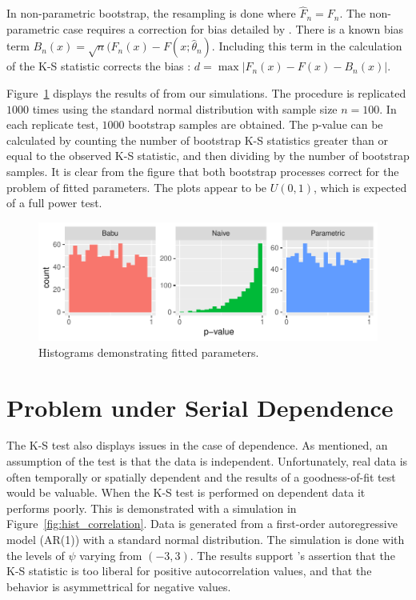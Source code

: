 \documentclass[12pt, letterpaper, titlepage]{article}
\begin{document}
In non-parametric bootstrap, the resampling is done where $\hat{F}_n = F_n$. The non-parametric
case requires a correction for bias detailed by \citet{Babu}. There is a known bias
term $B_{n}(x) = \sqrt{n}(F_{n}(x) - F(x;\hat{\theta}_n)$. Including this term in the
calculation of the K-S statistic corrects the bias \citet{Babu}:
$d = \max\lvert F_{n}(x) - F(x) - B_{n}(x) \rvert$.

Figure~\ref{fig:hist_fitted} displays the results of from our simulations. The procedure 
is replicated $1000$ times using the standard normal distribution with sample size $n=100$. 
In each replicate test, $1000$ bootstrap samples are obtained. The p-value can be calculated
by counting the number of bootstrap K-S statistics greater than or equal to the observed K-S statistic, 
and then dividing by the number of bootstrap samples. It is clear from the figure that both
bootstrap processes correct for the problem of fitted parameters. The plots appear to be
$U(0,1)$, which is expected of a full power test.

\begin{figure}[tbp]
  \centering
  \includegraphics{hist_fitted}
  \caption{Histograms demonstrating fitted parameters.}
  \label{fig:hist_fitted}
\end{figure}

\hypertarget{sec:dependence}{%
\section{Problem under Serial Dependence}\label{sec:dependence}}

The K-S test also displays issues in the case of dependence. As mentioned, an assumption of the 
test is that the data is independent. Unfortunately, real data is often temporally
or spatially dependent and the results of a goodness-of-fit test would be valuable. 
When the K-S test is performed on dependent data it performs poorly. This is demonstrated
with a simulation in Figure~\ref{fig:hist_correlation}. Data is generated from a
first-order autoregressive model (AR(1)) with a standard normal distribution. The simulation
is done with the levels of $\psi$ varying from $(-3,3)$. The results support \citet{Durilleul}'s 
assertion that the K-S statistic is too liberal for positive autocorrelation values, and 
that the behavior is asymmettrical for negative values.
\end{document}
